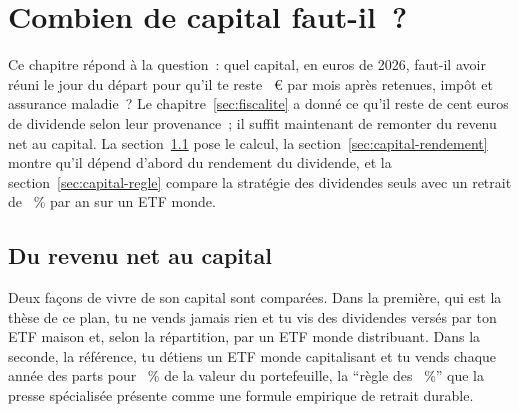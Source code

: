 \section{Combien de capital faut-il~?}\label{sec:capital}

Ce chapitre r\'epond \`a la question~: quel capital, en euros de 2026, faut-il avoir r\'euni le jour
du d\'epart pour qu'il te reste \ZielMonat~€ par mois apr\`es retenues, imp\^ot et assurance maladie~?
Le chapitre~\ref{sec:fiscalite} a donn\'e ce qu'il reste de cent euros de dividende selon leur
provenance~; il suffit maintenant de remonter du revenu net au capital. La
section~\ref{sec:capital-methode} pose le calcul, la section~\ref{sec:capital-rendement} montre qu'il
d\'epend d'abord du rendement du dividende, et la section~\ref{sec:capital-regle} compare la strat\'egie
des dividendes seuls avec un retrait de \TauxRetrait~\% par an sur un ETF monde.

\subsection{Du revenu net au capital}\label{sec:capital-methode}

Deux fa\c{c}ons de vivre de son capital sont compar\'ees. Dans la premi\`ere, qui est la th\`ese de ce
plan, tu ne vends jamais rien et tu vis des dividendes vers\'es par ton ETF maison et, selon la
r\'epartition, par un ETF monde distribuant. Dans la seconde, la r\'ef\'erence, tu d\'etiens un ETF
monde capitalisant et tu vends chaque ann\'ee des parts pour \TauxRetrait~\% de la valeur du
portefeuille, la \enquote{r\`egle des \TauxRetrait~\%} que la presse sp\'ecialis\'ee pr\'esente comme
une formule empirique de retrait durable.


